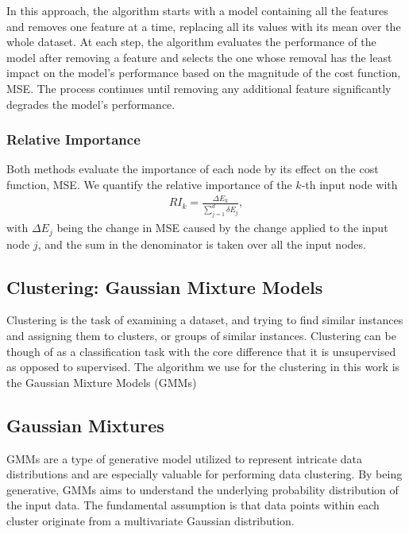 \documentclass{article}
\begin{document}
In this approach, the algorithm starts with a model containing all the features and removes one feature at a time, replacing all its values with its mean over the whole dataset. At each step, the algorithm evaluates the performance of the model after removing a feature and selects the one whose removal has the least impact on the model's performance based on the magnitude of the cost function, MSE. The process continues until removing any additional feature significantly degrades the model's performance.

\subsubsection{Relative Importance}

Both methods evaluate the importance of each node by its effect on the cost function, MSE. We quantify the relative importance of the $k$-th input node with
\begin{align}
	RI_k=\frac{\Delta E_k}{\sum_{j=1}^d\delta E_j},
\end{align}
with $\Delta E_j$ being the change in MSE caused by the change applied to the input node $j$, and the sum in the denominator is taken over all the input nodes.





\subsection{Clustering: Gaussian Mixture Models}

Clustering is the task of examining a dataset, and trying to find similar instances and assigning them to clusters, or groups of similar instances. Clustering can be though of as a classification task with the core difference that it is unsupervised as opposed to supervised. The algorithm we use for the clustering in this work is the Gaussian Mixture Models (GMMs) 





\subsection{Gaussian Mixtures}

GMMs are a type of generative model utilized to represent intricate data distributions and are especially valuable for performing data clustering. By being generative, GMMs aims to understand the underlying probability distribution of the input data. The fundamental assumption is that data points within each cluster originate from a multivariate Gaussian distribution.
\end{document}
